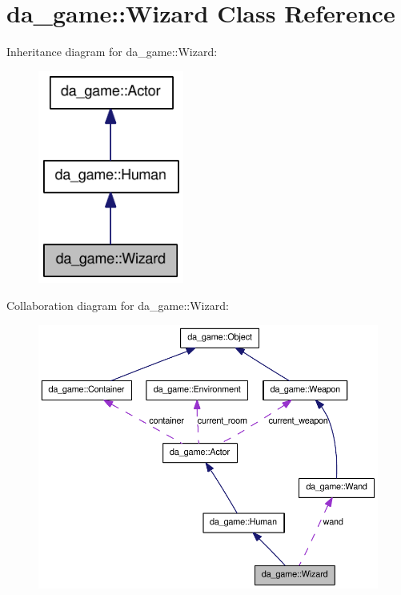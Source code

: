 \hypertarget{classda__game_1_1Wizard}{
\section{da\_\-game::Wizard Class Reference}
\label{classda__game_1_1Wizard}
}
Inheritance diagram for da\_\-game::Wizard:\nopagebreak
\begin{figure}[H]
\begin{center}
\leavevmode
\includegraphics[width=136pt]{classda__game_1_1Wizard__inherit__graph}
\end{center}
\end{figure}
Collaboration diagram for da\_\-game::Wizard:\nopagebreak
\begin{figure}[H]
\begin{center}
\leavevmode
\includegraphics[width=400pt]{classda__game_1_1Wizard__coll__graph}
\end{center}
\end{figure}

